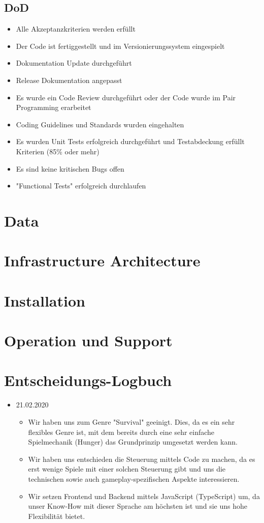 \documentclass[a4paper, 11pt]{scrartcl}
\let\oldsection\section
\renewcommand\section{\clearpage\oldsection}
\begin{document}
\subsection{DoD}
\begin{itemize}
\item Alle Akzeptanzkriterien werden erfüllt
\item Der Code ist fertiggestellt und im Versionierungssystem eingespielt
\item Dokumentation Update durchgeführt
\item Release Dokumentation angepasst
\item Es wurde ein Code Review durchgeführt oder der Code wurde im Pair Programming erarbeitet
\item Coding Guidelines und Standards wurden eingehalten
\item Es wurden Unit Tests erfolgreich durchgeführt und Testabdeckung erfüllt Kriterien (85\% oder mehr) 
\item Es sind keine kritischen Bugs offen
\item "Functional Tests" erfolgreich durchlaufen
\end{itemize}
\section{Data}

\section{Infrastructure Architecture}

\section{Installation}

\section{Operation und Support}

\section{Entscheidungs-Logbuch}

\begin{itemize}
  \item 21.02.2020
  \begin{itemize}
    \item Wir haben uns zum Genre "Survival" geeinigt. Dies, da es ein sehr flexibles Genre ist, mit dem bereits durch eine sehr einfache Spielmechanik (Hunger) das Grundprinzip umgesetzt werden kann.
    \item Wir haben uns entschieden die Steuerung mittels Code zu machen, da es erst wenige Spiele mit einer solchen Steuerung gibt und uns die technischen sowie auch gameplay-spezifischen Aspekte interessieren.
    \item Wir setzen Frontend und Backend mittels JavaScript (TypeScript) um, da unser Know-How mit dieser Sprache am höchsten ist und sie uns hohe Flexibilität bietet.
  \end{itemize}
\end{itemize}

\clearpage

\printglossary[type=\acronymtype]

\printglossary
\end{document}

